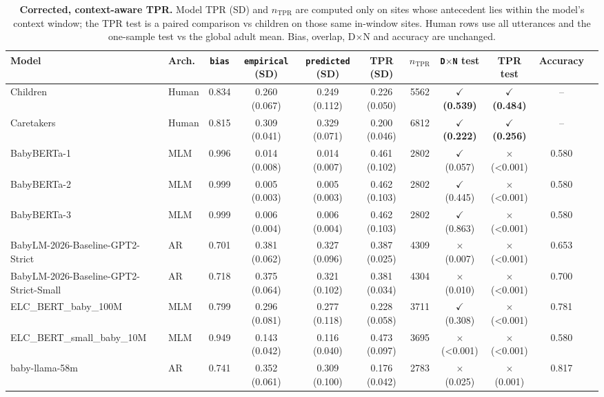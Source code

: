 \begin{table}[]
\caption{\textbf{Corrected, context-aware TPR.} Model TPR (SD) and $n_\text{TPR}$ are computed only on sites whose antecedent lies within the model's context window; the TPR test is a paired comparison vs children on those same in-window sites. Human rows use all utterances and the one-sample test vs the global adult mean. Bias, overlap, D$\times$N and accuracy are unchanged.}
\label{tab:full-results-corrected}
\begin{adjustbox}{max width=\textwidth}
\begin{tabular}{llccccccccc}
\toprule
Model & Arch. & \texttt{bias} & \texttt{empirical} (SD) & \texttt{predicted} (SD) & TPR (SD) & $n_\text{TPR}$ & \texttt{D$\times$N} test & TPR test & Accuracy \\
\midrule
Children & Human & 0.834 & 0.260 (0.067) & 0.249 (0.112) & 0.226 (0.050) & 5562 & \textbf{$\checkmark$ (0.539)} & \textbf{$\checkmark$ (0.484)} & -- \\
Caretakers & Human & 0.815 & 0.309 (0.041) & 0.329 (0.071) & 0.200 (0.046) & 6812 & \textbf{$\checkmark$ (0.222)} & \textbf{$\checkmark$ (0.256)} & -- \\
\midrule
BabyBERTa-1 & MLM & 0.996 & 0.014 (0.008) & 0.014 (0.007) & 0.461 (0.102) & 2802 & $\checkmark$ (0.057) & $\times$ (<0.001) & 0.580 \\
BabyBERTa-2 & MLM & 0.999 & 0.005 (0.003) & 0.005 (0.003) & 0.462 (0.103) & 2802 & $\checkmark$ (0.445) & $\times$ (<0.001) & 0.580 \\
BabyBERTa-3 & MLM & 0.999 & 0.006 (0.004) & 0.006 (0.004) & 0.462 (0.103) & 2802 & $\checkmark$ (0.863) & $\times$ (<0.001) & 0.580 \\
BabyLM-2026-Baseline-GPT2-Strict & AR & 0.701 & 0.381 (0.062) & 0.327 (0.096) & 0.387 (0.025) & 4309 & $\times$ (0.007) & $\times$ (<0.001) & 0.653 \\
BabyLM-2026-Baseline-GPT2-Strict-Small & AR & 0.718 & 0.375 (0.064) & 0.321 (0.102) & 0.381 (0.034) & 4304 & $\times$ (0.010) & $\times$ (<0.001) & 0.700 \\
ELC\_BERT\_baby\_100M & MLM & 0.799 & 0.296 (0.081) & 0.277 (0.118) & 0.228 (0.058) & 3711 & $\checkmark$ (0.308) & $\times$ (<0.001) & 0.781 \\
ELC\_BERT\_small\_baby\_10M & MLM & 0.949 & 0.143 (0.042) & 0.116 (0.040) & 0.473 (0.097) & 3695 & $\times$ (<0.001) & $\times$ (<0.001) & 0.580 \\
baby-llama-58m & AR & 0.741 & 0.352 (0.061) & 0.309 (0.100) & 0.176 (0.042) & 2783 & $\times$ (0.025) & $\times$ (0.001) & 0.817 \\

\end{tabular}
\end{adjustbox}
\end{table}
